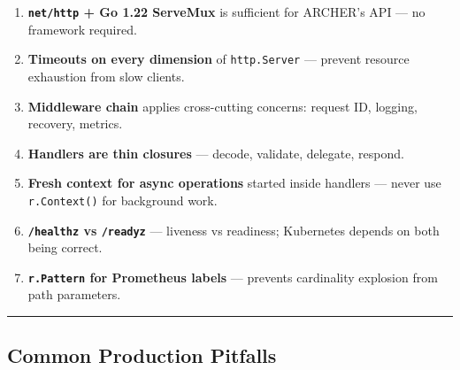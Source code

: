 \documentclass[
]{article}
\providecommand{\tightlist}{%
  \setlength{\itemsep}{0pt}\setlength{\parskip}{0pt}}
\begin{document}
\begin{enumerate}
\def\labelenumi{\arabic{enumi}.}
\tightlist
\item
  \textbf{\texttt{net/http} + Go 1.22 ServeMux} is sufficient for
  ARCHER's API --- no framework required.
\item
  \textbf{Timeouts on every dimension} of \texttt{http.Server} ---
  prevent resource exhaustion from slow clients.
\item
  \textbf{Middleware chain} applies cross-cutting concerns: request ID,
  logging, recovery, metrics.
\item
  \textbf{Handlers are thin closures} --- decode, validate, delegate,
  respond.
\item
  \textbf{Fresh context for async operations} started inside handlers
  --- never use \texttt{r.Context()} for background work.
\item
  \textbf{\texttt{/healthz} vs \texttt{/readyz}} --- liveness vs
  readiness; Kubernetes depends on both being correct.
\item
  \textbf{\texttt{r.Pattern} for Prometheus labels} --- prevents
  cardinality explosion from path parameters.
\end{enumerate}

\begin{center}\rule{0.5\linewidth}{0.5pt}\end{center}

\hypertarget{common-production-pitfalls}{%
\subsection{Common Production
Pitfalls}\label{common-production-pitfalls}}
\end{document}
